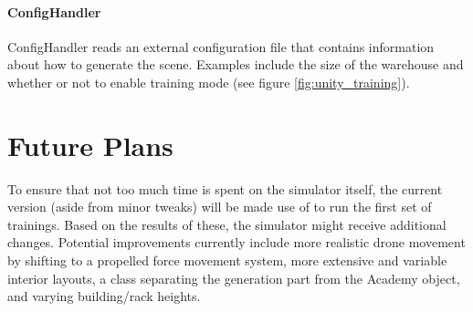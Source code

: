 \paragraph{ConfigHandler} ConfigHandler reads an external configuration file that contains information about how to generate the scene. Examples include the size of the warehouse and whether or not to enable training mode (see figure \ref{fig:unity_training}).

\pagebreak
\section{Future Plans}
To ensure that not too much time is spent on the simulator itself, the current version (aside from minor tweaks) will be made use of to run the first set of trainings. Based on the results of these, the simulator might receive additional changes. Potential improvements currently include more realistic drone movement by shifting to a propelled force movement system, more extensive and variable interior layouts, a class separating the generation part from the Academy object, and varying building/rack heights. 